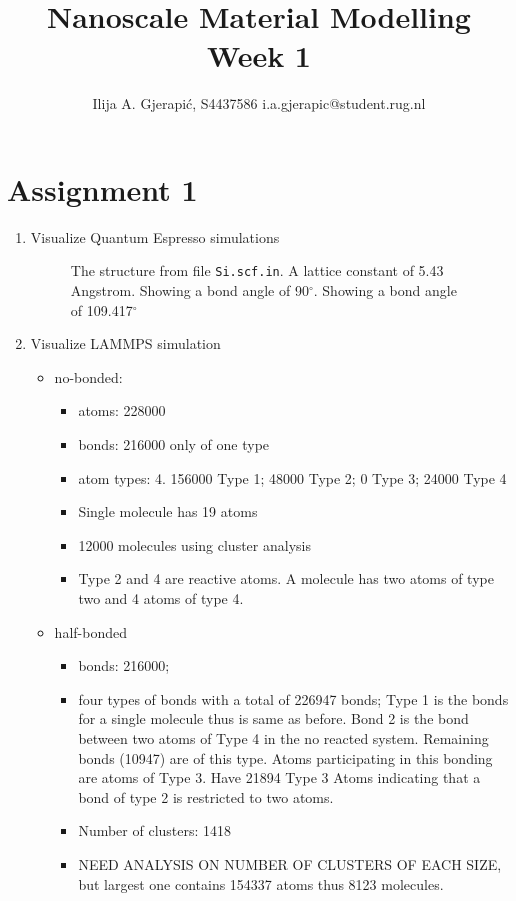 \documentclass[10pt,a4paper]{labreport}
\title{Nanoscale Material Modelling
\\
\normalsize{Week 1}} %
\author{Ilija A. Gjerapić, S4437586 i.a.gjerapic@student.rug.nl} %
\begin{document}
\twocolumn[
  \maketitle
  \begin{@twocolumnfalse}

  \end{@twocolumnfalse}
]


  

\thispagestyle{firststyle}

\section*{Assignment 1}
\begin{enumerate}
  \item Visualize Quantum Espresso simulations
  \begin{figure}[h]
    \centering 
    \begin{subfigure}{0.33\textwidth}
      
    \end{subfigure}
    \caption{The structure from file \texttt{Si.scf.in}. A lattice constant of 5.43 Angstrom. Showing a bond angle of 90$^\circ$. Showing a bond angle of 109.417$^\circ$}
  \end{figure}

  \item Visualize LAMMPS simulation 
  \begin{itemize}
    \item no-bonded:
    \begin{itemize}
      \item atoms: 228000
      \item bonds: 216000 only of one type
      \item atom types: 4. 156000 Type 1; 48000 Type 2; 0 Type 3; 24000 Type 4
      \item Single molecule has 19 atoms
      \item 12000 molecules using cluster analysis
      \item Type 2 and 4 are reactive atoms. A molecule has two atoms of type two and 4 atoms of type 4.  
    \end{itemize}
    \item half-bonded
    \begin{itemize}
      \item bonds: 216000;
      \item four types of bonds with a total of 226947 bonds; Type 1 is the bonds for a single molecule thus is same as before. Bond 2 is the bond between two atoms of Type 4 in the no reacted system. Remaining bonds (10947) are of this type. Atoms participating in this bonding are atoms of Type 3. Have 21894 Type 3 Atoms indicating that a bond of type 2 is restricted to two atoms. 
      \item Number of clusters: 1418
      \item NEED ANALYSIS ON NUMBER OF CLUSTERS OF EACH SIZE, but largest one contains 154337 atoms thus 8123 molecules. 
    \end{itemize}



\end{itemize}
\end{enumerate}
\end{document}
